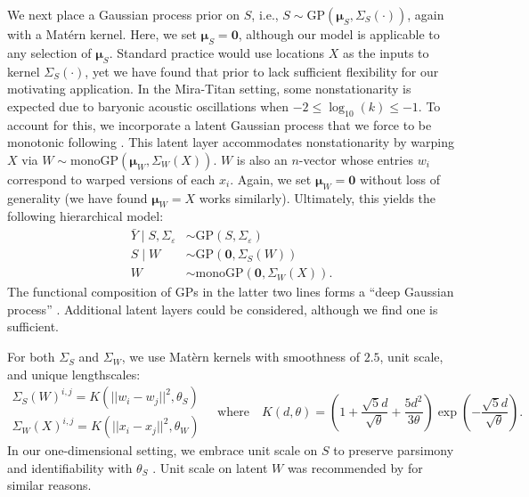 \documentclass[11pt]{article}
\begin{document}
We next place a Gaussian process prior on $S$, i.e.,
$S\sim \mathrm{GP}\left(\boldsymbol{\mu}_S, \Sigma_S(\cdot)\right)$, again with a 
Mat\'ern kernel. Here, we set $\boldsymbol{\mu}_S=\mathbf{0}$, although our model
is applicable to any selection of $\boldsymbol{\mu}_S$. Standard practice would 
use locations $X$ as the inputs to kernel $\Sigma_S(\cdot)$, yet we have found that 
prior to lack sufficient flexibility for our motivating
application.  In the Mira-Titan setting, some nonstationarity is expected due to 
baryonic acoustic oscillations when $-2 \leq \log_{10}(k) \leq -1$. To account 
for this, we incorporate a latent Gaussian process that we force to be monotonic
following \citet[][denoted ``monoGP'']{barnett2025monotonic}.  This latent layer
accommodates nonstationarity by warping $X$ via 
$W \sim \mathrm{monoGP}\left(\boldsymbol{\mu}_W, \Sigma_W(X)\right)$.
$W$ is also an $n$-vector whose entries $w_i$ correspond to warped versions of each $x_i$.
Again, we set $\boldsymbol{\mu}_W = \mathbf{0}$ without loss of generality (we have
found $\boldsymbol{\mu}_W = X$ works similarly).
Ultimately, this yields the following hierarchical model:
\begin{equation}\label{eq:dgphm}
\begin{aligned}
\bar{Y}\mid S,\Sigma_\varepsilon &\sim \mathrm{GP}(S,\Sigma_\varepsilon) \\
S\mid W &\sim \mathrm{GP}\left(\mathbf{0}, \Sigma_S(W)\right) \\
W &\sim \mathrm{monoGP}\left(\mathbf{0}, \Sigma_W(X)\right).
\end{aligned}
\end{equation}
The functional composition of GPs in the latter two lines forms a ``deep Gaussian process'' 
\citep{damianou2013deep,dunlop2018deep}. Additional latent layers could be considered, 
although we find one is sufficient.

For both $\Sigma_S$ and $\Sigma_W$, we use Mat\`ern kernels with smoothness of $2.5$,
unit scale, and unique lengthscales:
\begin{equation}\label{eq:cov}
\begin{array}{l}
\Sigma_S(W)^{i,j} = K\left(||w_i - w_j||^2, \theta_S\right) \\[7pt]
\Sigma_W(X)^{i,j} = K\left(||x_i - x_j||^2, \theta_W\right)
\end{array}
\quad\textrm{where}\quad
K(d, \theta) = \left( 1 + \frac{\sqrt{5}d}{\sqrt{\theta}} + 
  \frac{5d^2}{3\theta}\right) \exp\left(-\frac{\sqrt{5}d}{\sqrt{\theta}}\right).
\end{equation}
In our one-dimensional setting, we embrace unit scale on $S$ to preserve parsimony 
and identifiability with $\theta_S$ \citep{zhang2004inconsistent}.
Unit scale on latent $W$ was recommended by \citet{sauer2023active} for similar reasons.
\end{document}
